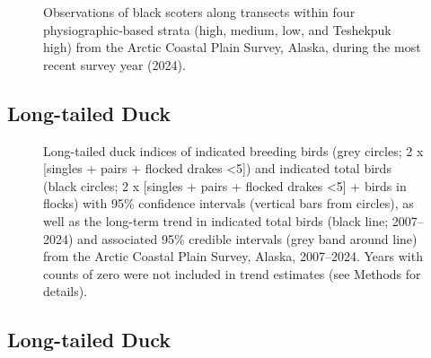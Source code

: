 \documentclass[
]{article}
\begin{document}
\begin{figure}


\caption{\label{fig-BLSCmap}Observations of black scoters along
transects within four physiographic-based strata (high, medium, low, and
Teshekpuk high) from the Arctic Coastal Plain Survey, Alaska, during the
most recent survey year (2024).}

\end{figure}%

\newpage{}

\subsection*{Long-tailed Duck}\label{long-tailed-duck}

\begin{figure}


\caption{\label{fig-LTDU}Long-tailed duck indices of indicated breeding
birds (grey circles; 2 x {[}singles + pairs + flocked drakes
\textless5{]}) and indicated total birds (black circles; 2 x {[}singles
+ pairs + flocked drakes \textless5{]} + birds in flocks) with 95\%
confidence intervals (vertical bars from circles), as well as the
long-term trend in indicated total birds (black line; 2007--2024) and
associated 95\% credible intervals (grey band around line) from the
Arctic Coastal Plain Survey, Alaska, 2007--2024. Years with counts of
zero were not included in trend estimates (see Methods for details).}

\end{figure}%

\newpage{}

\subsection*{Long-tailed Duck}\label{long-tailed-duck-1}

\begingroup\fontsize{10}{12}\selectfont
\end{document}

